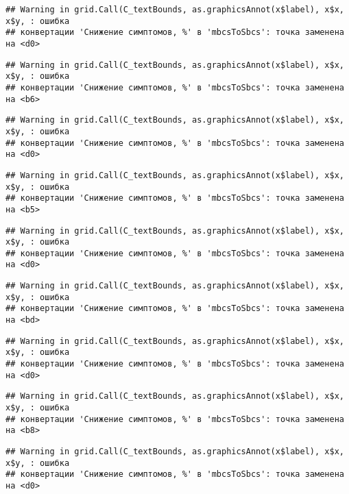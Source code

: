 \documentclass[
]{article}
\begin{document}
\begin{verbatim}
## Warning in grid.Call(C_textBounds, as.graphicsAnnot(x$label), x$x, x$y, : ошибка
## конвертации 'Снижение симптомов, %' в 'mbcsToSbcs': точка заменена на <d0>
\end{verbatim}

\begin{verbatim}
## Warning in grid.Call(C_textBounds, as.graphicsAnnot(x$label), x$x, x$y, : ошибка
## конвертации 'Снижение симптомов, %' в 'mbcsToSbcs': точка заменена на <b6>
\end{verbatim}

\begin{verbatim}
## Warning in grid.Call(C_textBounds, as.graphicsAnnot(x$label), x$x, x$y, : ошибка
## конвертации 'Снижение симптомов, %' в 'mbcsToSbcs': точка заменена на <d0>
\end{verbatim}

\begin{verbatim}
## Warning in grid.Call(C_textBounds, as.graphicsAnnot(x$label), x$x, x$y, : ошибка
## конвертации 'Снижение симптомов, %' в 'mbcsToSbcs': точка заменена на <b5>
\end{verbatim}

\begin{verbatim}
## Warning in grid.Call(C_textBounds, as.graphicsAnnot(x$label), x$x, x$y, : ошибка
## конвертации 'Снижение симптомов, %' в 'mbcsToSbcs': точка заменена на <d0>
\end{verbatim}

\begin{verbatim}
## Warning in grid.Call(C_textBounds, as.graphicsAnnot(x$label), x$x, x$y, : ошибка
## конвертации 'Снижение симптомов, %' в 'mbcsToSbcs': точка заменена на <bd>
\end{verbatim}

\begin{verbatim}
## Warning in grid.Call(C_textBounds, as.graphicsAnnot(x$label), x$x, x$y, : ошибка
## конвертации 'Снижение симптомов, %' в 'mbcsToSbcs': точка заменена на <d0>
\end{verbatim}

\begin{verbatim}
## Warning in grid.Call(C_textBounds, as.graphicsAnnot(x$label), x$x, x$y, : ошибка
## конвертации 'Снижение симптомов, %' в 'mbcsToSbcs': точка заменена на <b8>
\end{verbatim}

\begin{verbatim}
## Warning in grid.Call(C_textBounds, as.graphicsAnnot(x$label), x$x, x$y, : ошибка
## конвертации 'Снижение симптомов, %' в 'mbcsToSbcs': точка заменена на <d0>
\end{verbatim}
\end{document}
